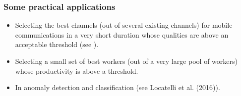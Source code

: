 \begin{frame}
\frametitle{Some practical applications}
\begin{itemize}
\item<1-> Selecting the best channels (out of several existing channels) for mobile communications in a very short duration whose qualities are above an acceptable threshold (see \cite{audibert2010best}).
\item<2-> Selecting a small set of best workers (out of a very large pool of workers) whose productivity is above a threshold.
\item<3-> In anomaly detection and classification (see {Locatelli et al. (2016)}).
\end{itemize}
\end{frame}

